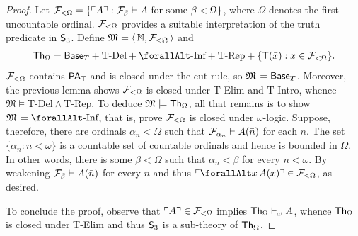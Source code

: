 \documentclass[UKenglish,cleveref,DIV=12]{scrartcl}
\let\forall\forallAlt
\theoremstyle{definition}
\theoremstyle{definition}
\begin{document}
\begin{proof}
Let $\mathcal{F}_{<\Omega}=\{\ulcorner{A}\urcorner:\mathcal{F}_\beta\vdash A\text{ for some $\beta<\Omega$}\}$,
where $\Omega$ denotes the first uncountable ordinal. $\mathcal{F}_{<\Omega}$
provides a suitable interpretation of the truth predicate in $\mathsf{S}_3$.
Define $\mathfrak M=\langle\,\mathbb N,\mathcal{F}_{<\Omega}\,\rangle$ and
\begin{align*}
  \Th_\Omega=\BaseT+\text{T-Del}+\text{$\forall$-Inf}+\text{T-Rep}+\{\T(\bar x):x\in\FF_{<\Omega}\}.
\end{align*}
$\mathcal{F}_{<\Omega}$ contains $\mathsf{PA}_{\mathsf{T}}$ and is closed under the cut rule, so
$\mathfrak{M}\models \mathsf{Base}_T$. Moreover, the previous lemma shows $\mathcal{F}_{<\Omega}$
is closed under T-Elim and T-Intro, whence  $\mathfrak{M}\models
\text{T-Del}\land\text{T-Rep}$. To deduce $ \mathfrak{M}\models \mathsf{Th}_\Omega$, all that remains is to show $\mathfrak{M}\models
\text{$\forall$-Inf}$, that is, prove $\mathcal{F}_{<\Omega}$ is closed under
$\omega$-logic. Suppose, therefore, there are ordinals $\alpha_n<\Omega$ such that
$\mathcal{F}_{\alpha_n}\vdash A(\bar n)$ for each $n$. The set $\{\alpha_n:n<\omega\}$
is a countable set of countable ordinals and hence is bounded in $\Omega$. In
other words, there is some $\beta<\Omega$ such that $\alpha_n<\beta$ for every
$n<\omega$. By weakening $\mathcal{F}_\beta\vdash A(\bar n)$ for every $n$ and thus
$\gn{\forall x\, A(x)}\in\FF_{<\Omega}$, as desired.

To conclude the proof, observe that $\ulcorner{A}\urcorner\in\mathcal{F}_{<\Omega}$
implies $\mathsf{Th}_\Omega\vdash_\omega A$, whence $\mathsf{Th}_\Omega$ is closed
under T-Elim and thus $\mathsf{S}_3$ is a sub-theory of $\mathsf{Th}_\Omega$.
\end{proof}
\end{document}
